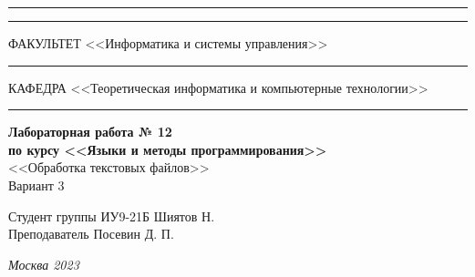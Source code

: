 \documentclass[a4paper, 14pt]{extarticle}
\begin{document}
\begin{titlepage}
\vspace{-25pt}
\hspace{-35pt}\rule{\textwidth}{2.3pt}

\vspace*{-20.3pt}
\hspace{-35pt}\rule{\textwidth}{0.4pt}

\vspace{1.5ex}
\hspace{-35pt} \noindent \small ФАКУЛЬТЕТ\hspace{80pt} <<Информатика и системы управления>>

\vspace*{-16pt}
\hspace{47pt}\rule{0.83\textwidth}{0.4pt}

\vspace{0.5ex}
\hspace{-35pt} \noindent \small КАФЕДРА\hspace{50pt} <<Теоретическая информатика и компьютерные технологии>>

\vspace*{-16pt}
\hspace{30pt}\rule{0.866\textwidth}{0.4pt}
  
\vspace{11em}

\begin{center}
\Large {\bf Лабораторная работа № 12} \\ 
\large {\bf по курсу <<Языки и методы программирования>>} \\
\large <<Обработка текстовых файлов>> \\
\Large Вариант 3
\end{center}\normalsize

\vspace{8em}


\begin{flushright}
  {Студент группы ИУ9-21Б Шиятов Н. \hspace*{15pt}\\ 
  \vspace{2ex}
  Преподаватель Посевин Д. П.\hspace*{15pt}}
\end{flushright}

\bigskip

\vfill
 

\begin{center}
\textsl{Москва 2023}
\end{center}
\end{titlepage}
\end{document}
